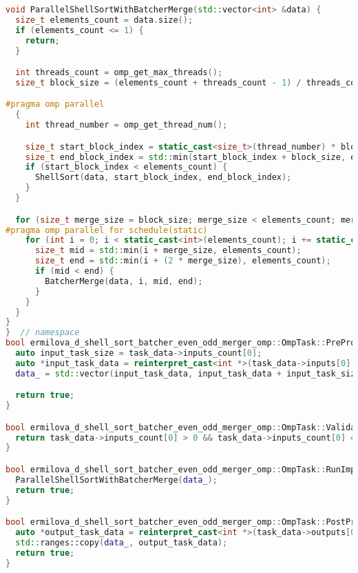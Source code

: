 \documentclass[a4paper,12pt]{article}
\begin{document}
\begin{lstlisting}[language=C++]
void ParallelShellSortWithBatcherMerge(std::vector<int> &data) {
  size_t elements_count = data.size();
  if (elements_count <= 1) {
    return;
  }

  int threads_count = omp_get_max_threads();
  size_t block_size = (elements_count + threads_count - 1) / threads_count;

#pragma omp parallel
  {
    int thread_number = omp_get_thread_num();

    size_t start_block_index = static_cast<size_t>(thread_number) * block_size;
    size_t end_block_index = std::min(start_block_index + block_size, elements_count) - 1;
    if (start_block_index < elements_count) {
      ShellSort(data, start_block_index, end_block_index);
    }
  }

  for (size_t merge_size = block_size; merge_size < elements_count; merge_size *= 2) {
#pragma omp parallel for schedule(static)
    for (int i = 0; i < static_cast<int>(elements_count); i += static_cast<int>(2 * merge_size)) {
      size_t mid = std::min(i + merge_size, elements_count);
      size_t end = std::min(i + (2 * merge_size), elements_count);
      if (mid < end) {
        BatcherMerge(data, i, mid, end);
      }
    }
  }
}
}  // namespace
bool ermilova_d_shell_sort_batcher_even_odd_merger_omp::OmpTask::PreProcessingImpl() {
  auto input_task_size = task_data->inputs_count[0];
  auto *input_task_data = reinterpret_cast<int *>(task_data->inputs[0]);
  data_ = std::vector(input_task_data, input_task_data + input_task_size);

  return true;
}

bool ermilova_d_shell_sort_batcher_even_odd_merger_omp::OmpTask::ValidationImpl() {
  return task_data->inputs_count[0] > 0 && task_data->inputs_count[0] == task_data->outputs_count[0];
}

bool ermilova_d_shell_sort_batcher_even_odd_merger_omp::OmpTask::RunImpl() {
  ParallelShellSortWithBatcherMerge(data_);
  return true;
}

bool ermilova_d_shell_sort_batcher_even_odd_merger_omp::OmpTask::PostProcessingImpl() {
  auto *output_task_data = reinterpret_cast<int *>(task_data->outputs[0]);
  std::ranges::copy(data_, output_task_data);
  return true;
}
\end{lstlisting}
\end{document}

